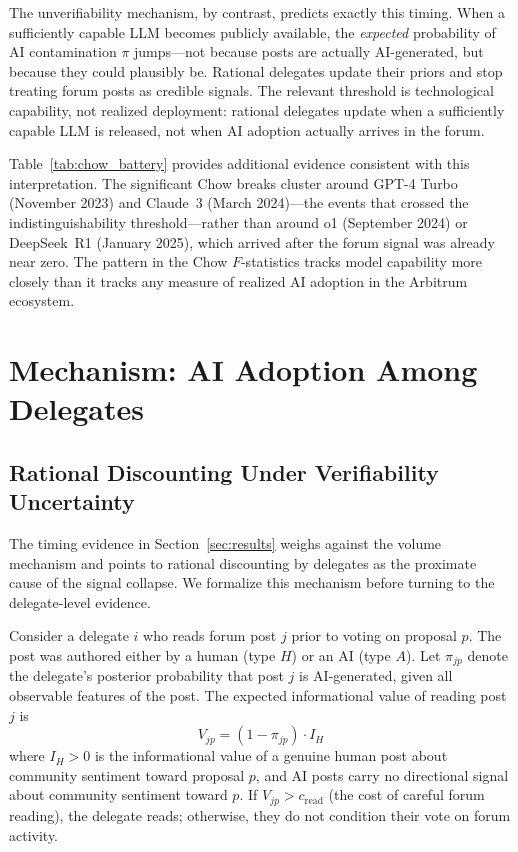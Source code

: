 \documentclass[12pt]{article}
\begin{document}
The unverifiability mechanism, by contrast, predicts exactly this timing. When a
sufficiently capable LLM becomes publicly available, the \emph{expected} probability
of AI contamination $\pi$ jumps---not because posts are actually AI-generated, but
because they could plausibly be. Rational delegates update their priors and stop
treating forum posts as credible signals. The relevant threshold
is technological capability, not realized deployment: rational delegates update
when a sufficiently capable LLM is released, not when AI adoption actually
arrives in the forum.

Table~\ref{tab:chow_battery} provides additional evidence consistent with this
interpretation. The significant Chow breaks cluster around GPT-4 Turbo
(November 2023) and Claude~3 (March 2024)---the events that crossed the
indistinguishability threshold---rather than around o1 (September 2024) or
DeepSeek~R1 (January 2025), which arrived after the forum signal was already near
zero. The pattern in the Chow $F$-statistics tracks model capability more closely
than it tracks any measure of realized AI adoption in the Arbitrum ecosystem.

\section{Mechanism: AI Adoption Among Delegates}
\label{sec:mechanism}


\subsection{Rational Discounting Under Verifiability Uncertainty}

The timing evidence in Section~\ref{sec:results} weighs against the volume mechanism
and points to rational discounting by delegates as the proximate cause of the
signal collapse. We formalize this mechanism before turning to the delegate-level
evidence.

Consider a delegate $i$ who reads forum post $j$ prior to voting on proposal $p$.
The post was authored either by a human (type $H$) or an AI (type $A$). Let
$\pi_{jp}$ denote the delegate's posterior probability that post $j$ is AI-generated,
given all observable features of the post. The expected informational value of
reading post $j$ is
\[
  V_{jp} = (1 - \pi_{jp}) \cdot I_H
\]
where $I_H > 0$ is the informational value of a genuine human post about community
sentiment toward proposal $p$, and AI posts carry no directional signal about community sentiment toward $p$.
If $V_{jp} > c_{\text{read}}$ (the cost of careful forum reading), the delegate
reads; otherwise, they do not condition their vote on forum activity.
\end{document}
